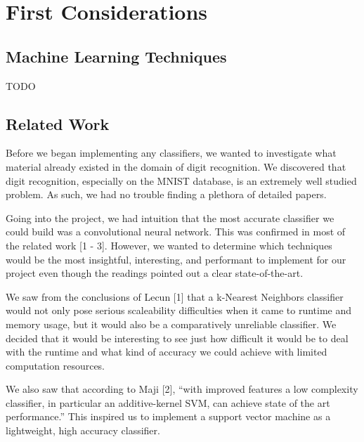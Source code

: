 \documentclass{article} %
\begin{document}
\section{First Considerations}
\subsection{Machine Learning Techniques}
TODO

\subsection{Related Work}
Before we began implementing any classifiers, we wanted to investigate what
material already existed in the domain of digit recognition. We discovered
that digit recognition, especially on the MNIST database, is an extremely well
studied problem. As such, we had no trouble finding a plethora of detailed
papers.

Going into the project, we had intuition that the most accurate classifier we
could build was a convolutional neural network. This was confirmed in most of
the related work [1 - 3].
However, we wanted to determine which techniques would be the most insightful,
interesting, and performant to implement for our project even though the
readings pointed out a clear state-of-the-art.

We saw from the
conclusions of Lecun [1] that a k-Nearest Neighbors classifier would not
only pose serious scaleability difficulties when it came to runtime and memory
usage, but it would also be a comparatively unreliable classifier. We decided
that it would be interesting to see just how difficult it would be to deal with
the runtime and what kind of accuracy we could achieve with limited
computation resources.

We also saw that according to Maji [2], ``with improved features a low
complexity classifier, in particular
an additive-kernel SVM, can achieve state of the art performance.'' This
inspired us to implement a support vector machine as a lightweight, high
accuracy classifier.

\end{document}
